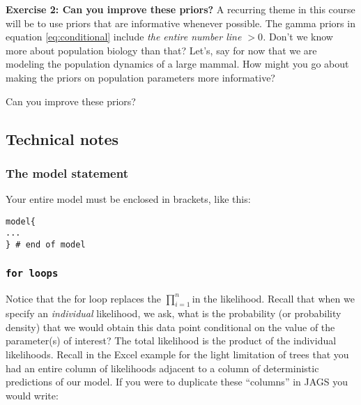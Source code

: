 \documentclass[12pt,english]{article}
\begin{document}
\bigskip
\belowcaptionskip=-40pt
\begin{exercise}
\begin{mdframed}
\doublespacing
\textbf{Exercise 2: Can you improve these priors?} A recurring theme in this course will be to use priors that are informative whenever possible. The gamma priors in equation \ref{eq:conditional} include \emph{the entire number line $>0$. }Don't we know more about population biology than that? Let's, say for now that we are modeling the population dynamics of a large mammal. How might you go about making the priors on population parameters more informative? 
\end{mdframed}
\captionsetup{textformat=empty, labelformat=empty}
\caption{Can you improve these priors?}
\label{ex:ImprovePriors}
\end{exercise}
\belowcaptionskip=0pt

\subsection{Technical notes}

\subsubsection{The model statement }

Your entire model must be enclosed in brackets, like this: 

\begin{Verbatim}
model{
...
} # end of model

\end{Verbatim}

\subsubsection{\texttt{for loops}}

Notice that the for loop replaces the $\prod_{i=1}^{n}$in the likelihood. Recall that when we specify an \emph{individual} likelihood, we ask, what is the probability (or probability density) that we would obtain this data point conditional on the value of the parameter(s) of interest? The total likelihood is the product of the individual likelihoods. Recall in the Excel example for the light limitation of trees that you had an entire column of likelihoods adjacent to a column of deterministic predictions of our model. If you were to duplicate these \enquote{columns} in JAGS you would write:
\end{document}
